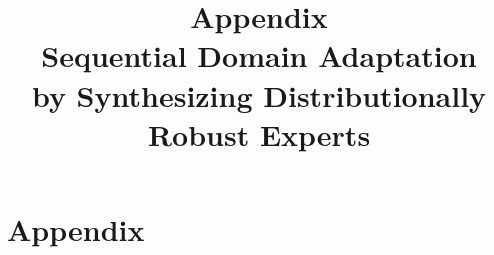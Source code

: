 \documentclass{article}
\begin{document}
\appendix
	\renewcommand\thesection{\Alph{section}}
	\renewcommand{\theequation}{A.\arabic{equation}}
	\renewcommand{\thefigure}{A.\arabic{figure}}
	\renewcommand{\thetable}{A.\arabic{table}}
\onecolumn
\title{Appendix \\
Sequential Domain Adaptation \\ by Synthesizing Distributionally Robust Experts
}
\date{}
\maketitle
\section{Appendix}
\end{document}
